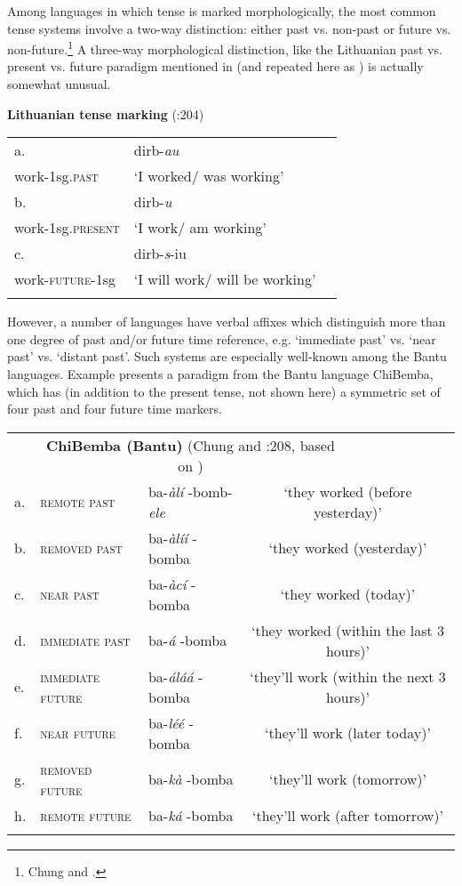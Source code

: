 Among languages in which tense is marked morphologically, the most common tense systems involve a two-way distinction: either past vs. non-past or future vs. non-future.\footnote{Chung and \citet{Timberlake1985}.} A three-way morphological distinction, like the Lithuanian past vs. present vs. future paradigm mentioned in  (and repeated here as ) is actually somewhat unusual.


\textbf{Lithuanian tense marking} (\citealt{ChungTimberlake1985}:204)

\begin{tabularx}{\textwidth}{XXX}
\lsptoprule
a. & dirb-\textit{au}\\
work-1sg\textsc{.past} & ‘I worked/ was working’\\
b. & dirb-\textit{u}\\
work-1sg\textsc{.present} & ‘I work/ am working’\\
c. & dirb-\textit{s}-iu\\
work-\textsc{future-}1sg & ‘I will work/ will be working’\\
\lspbottomrule
\end{tabularx}

However, a number of languages have verbal affixes which distinguish more than one degree of past and/or future time reference, e.g. ‘immediate past’ vs. ‘near past’ vs. ‘distant past’. Such systems are especially well-known among the Bantu languages. Example  presents a paradigm from the Bantu language ChiBemba, which has (in addition to the present tense, not shown here) a symmetric set of four past and four future time markers.


\begin{tabularx}{\textwidth}{XXXXX}
\lsptoprule
& \multicolumn{3}{c}{\textbf{ChiBemba (Bantu)} (Chung and \citealt{Timberlake1985}:208, based on \citealt{Givón1972})} & \\
a. & \scshape remote past & ba-\textit{àlí} -bomb-\textit{ele} & \multicolumn{2}{c}{‘they worked (before yesterday)’}\\
b. & \scshape removed past & ba-\textit{àlíí} -bomba & \multicolumn{2}{c}{‘they worked (yesterday)’}\\
c. & \scshape near past & ba-\textit{àcí} -bomba & \multicolumn{2}{c}{‘they worked (today)’}\\
d. & \scshape immediate past & ba-\textit{á} -bomba & \multicolumn{2}{c}{‘they worked (within the last 3 hours)’}\\
e. & \scshape immediate future & ba-\textit{áláá} -bomba & \multicolumn{2}{c}{‘they’ll work (within the next 3 hours)’}\\
f. & \scshape near future & ba-\textit{léé} -bomba & \multicolumn{2}{c}{‘they’ll work (later today)’}\\
g. & \scshape removed future & ba-\textit{kà} -bomba & \multicolumn{2}{c}{‘they’ll work (tomorrow)’}\\
h. & \scshape remote future & ba-\textit{ká} -bomba & \multicolumn{2}{c}{‘they’ll work (after tomorrow)’}\\
\lspbottomrule
\end{tabularx}

